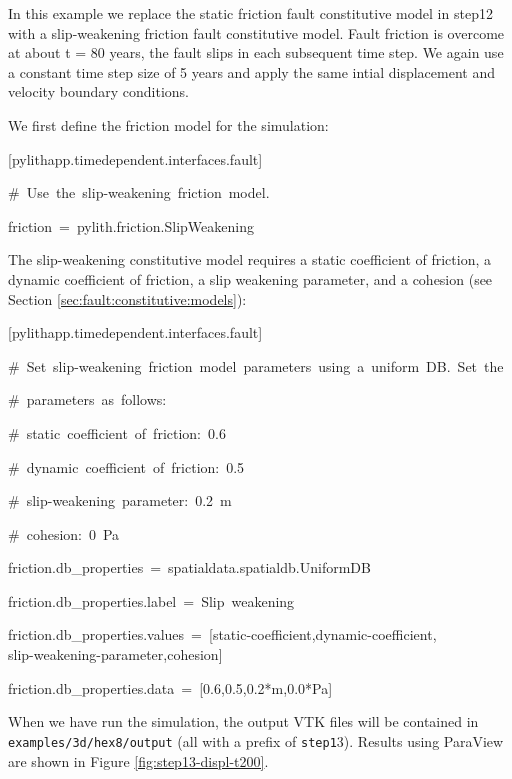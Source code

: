 In this example we replace the static friction fault constitutive
model in step12 with a slip-weakening friction fault constitutive
model. Fault friction is overcome at about t = 80 years, the fault
slips in each subsequent time step. We again use a constant time step
size of 5 years and apply the same intial displacement and velocity
boundary conditions.

We first define the friction model for the simulation:
\begin{lyxcode}
{[}pylithapp.timedependent.interfaces.fault{]}

\#~Use~the~slip-weakening~friction~model.

friction~=~pylith.friction.SlipWeakening
\end{lyxcode}
The slip-weakening constitutive model requires a static coefficient
of friction, a dynamic coefficient of friction, a slip weakening parameter,
and a cohesion (see Section \ref{sec:fault:constitutive:models}):
\begin{lyxcode}
{[}pylithapp.timedependent.interfaces.fault{]}

\#~Set~slip-weakening~friction~model~parameters~using~a~uniform~DB.~Set~the

\#~parameters~as~follows:

\#~static~coefficient~of~friction:~0.6

\#~dynamic~coefficient~of~friction:~0.5

\#~slip-weakening~parameter:~0.2~m

\#~cohesion:~0~Pa

friction.db\_properties~=~spatialdata.spatialdb.UniformDB

friction.db\_properties.label~=~Slip~weakening

friction.db\_properties.values~=~{[}static-coefficient,dynamic-coefficient,~\\
slip-weakening-parameter,cohesion{]}

friction.db\_properties.data~=~{[}0.6,0.5,0.2{*}m,0.0{*}Pa{]}
\end{lyxcode}
When we have run the simulation, the output VTK files will be contained
in \texttt{examples/3d/hex8/output} (all with a prefix of \texttt{step1}3).
Results using ParaView are shown in Figure \ref{fig:step13-displ-t200}.

